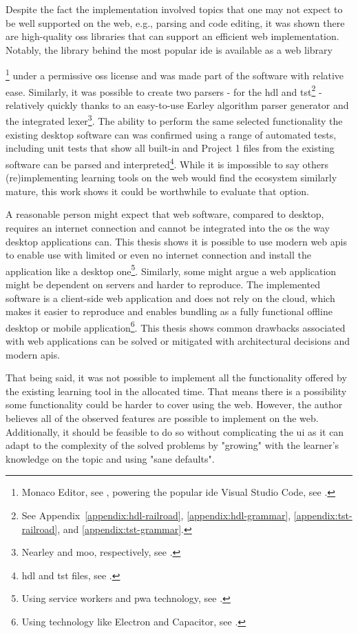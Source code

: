 Despite the fact the implementation involved topics that one may not expect to be well supported on the web, e.g., parsing and code editing, it was shown there are high-quality \gls{oss} libraries that can support an efficient web implementation.
Notably, the library behind the most popular \gls{ide} is available as a web library{\footnote{Monaco Editor, see , powering the popular \gls{ide} Visual Studio Code, see .} under a permissive \gls{oss} license and was made part of the software with relative ease.
Similarly, it was possible to create two parsers - for the \gls{hdl} and \gls{tst}\footnote{See Appendix~\ref{appendix:hdl-railroad}, \ref{appendix:hdl-grammar}, \ref{appendix:tst-railroad}, and \ref{appendix:tst-grammar}.} - relatively quickly thanks to an easy-to-use Earley algorithm parser generator and the integrated lexer\footnote{Nearley and moo, respectively, see .}.
The ability to perform the same selected functionality the existing desktop software can was confirmed using a range of automated tests, including unit tests that show all built-in and Project 1 files from the existing software can be parsed and interpreted\footnote{\gls{hdl} and \gls{tst} files, see .}.
While it is impossible to say others (re)implementing learning tools on the web would find the ecosystem similarly mature, this work shows it could be worthwhile to evaluate that option.

A reasonable person might expect that web software, compared to desktop, requires an internet connection and cannot be integrated into the \gls{os} the way desktop applications can.
This thesis shows it is possible to use modern web \glspl{api} to enable use with limited or even no internet connection and install the application like a desktop one\footnote{Using service workers and \gls{pwa} technology, see .}.
Similarly, some might argue a web application might be dependent on servers and harder to reproduce.
The implemented software is a client-side web application and does not rely on the cloud, which makes it easier to reproduce and enables bundling as a fully functional offline desktop or mobile application\footnote{Using technology like Electron and Capacitor, see .}.
This thesis shows common drawbacks associated with web applications can be solved or mitigated with architectural decisions and modern \glspl{api}.

That being said, it was not possible to implement all the functionality offered by the existing learning tool in the allocated time.
That means there is a possibility some functionality could be harder to cover using the web.
However, the author believes all of the observed features are possible to implement on the web.
Additionally, it should be feasible to do so without complicating the \gls{ui} as it can adapt to the complexity of the solved problems by "growing" with the learner's knowledge on the topic and using "sane defaults".

}
